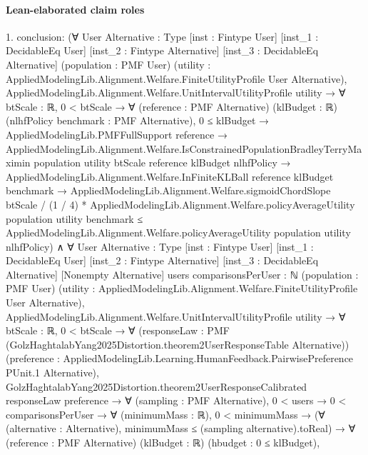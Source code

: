 \documentclass[10pt]{article}
\begin{document}
\paragraph{Lean-elaborated claim roles}\begin{ReviewVerbatim}
1. conclusion: (∀ {User Alternative : Type} [inst : Fintype User] [inst_1 : DecidableEq User] [inst_2 : Fintype Alternative]
    [inst_3 : DecidableEq Alternative] (population : PMF User)
    (utility : AppliedModelingLib.Alignment.Welfare.FiniteUtilityProfile User Alternative),
    AppliedModelingLib.Alignment.Welfare.UnitIntervalUtilityProfile utility →
      ∀ {btScale : ℝ},
        0 < btScale →
          ∀ (reference : PMF Alternative) (klBudget : ℝ) (nlhfPolicy benchmark : PMF Alternative),
            0 ≤ klBudget →
              AppliedModelingLib.PMFFullSupport reference →
                AppliedModelingLib.Alignment.Welfare.IsConstrainedPopulationBradleyTerryMaximin population utility
                    btScale reference klBudget nlhfPolicy →
                  AppliedModelingLib.Alignment.Welfare.InFiniteKLBall reference klBudget benchmark →
                    AppliedModelingLib.Alignment.Welfare.sigmoidChordSlope btScale / (1 / 4) *
                        AppliedModelingLib.Alignment.Welfare.policyAverageUtility population utility benchmark ≤
                      AppliedModelingLib.Alignment.Welfare.policyAverageUtility population utility nlhfPolicy) ∧
  ∀ {User Alternative : Type} [inst : Fintype User] [inst_1 : DecidableEq User] [inst_2 : Fintype Alternative]
    [inst_3 : DecidableEq Alternative] [Nonempty Alternative] {users comparisonsPerUser : ℕ} (population : PMF User)
    (utility : AppliedModelingLib.Alignment.Welfare.FiniteUtilityProfile User Alternative),
    AppliedModelingLib.Alignment.Welfare.UnitIntervalUtilityProfile utility →
      ∀ {btScale : ℝ},
        0 < btScale →
          ∀ (responseLaw : PMF (GolzHaghtalabYang2025Distortion.theorem2UserResponseTable Alternative))
            (preference : AppliedModelingLib.Learning.HumanFeedback.PairwisePreference PUnit.{1} Alternative),
            GolzHaghtalabYang2025Distortion.theorem2UserResponseCalibrated responseLaw preference →
              ∀ (sampling : PMF Alternative),
                0 < users →
                  0 < comparisonsPerUser →
                    ∀ (minimumMass : ℝ),
                      0 < minimumMass →
                        (∀ (alternative : Alternative), minimumMass ≤ (sampling alternative).toReal) →
                          ∀ (reference : PMF Alternative) (klBudget : ℝ) (hbudget : 0 ≤ klBudget),

\end{ReviewVerbatim}
\end{document}

